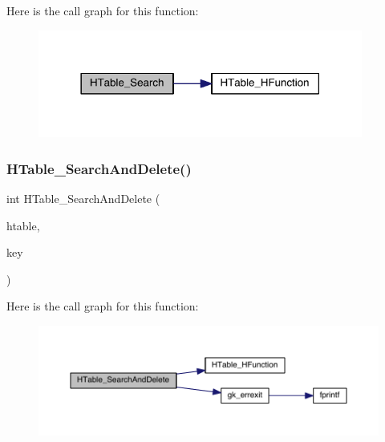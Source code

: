 Here is the call graph for this function\+:\nopagebreak
\begin{figure}[H]
\begin{center}
\leavevmode
\includegraphics[width=302pt]{a00098_a2b610fbd6017e0ef2e393c563b4809a5_cgraph}
\end{center}
\end{figure}
\mbox{\label{a00098_acb372a5e2569817f3a10cbeababda100}} 
\subsubsection{\texorpdfstring{H\+Table\+\_\+\+Search\+And\+Delete()}{HTable\_SearchAndDelete()}}
{\footnotesize\ttfamily int H\+Table\+\_\+\+Search\+And\+Delete (\begin{DoxyParamCaption}\item[{\hyperlink{a00650}{gk\+\_\+\+H\+Table\+\_\+t} $\ast$}]{htable,  }\item[{int}]{key }\end{DoxyParamCaption})}

Here is the call graph for this function\+:\nopagebreak
\begin{figure}[H]
\begin{center}
\leavevmode
\includegraphics[width=350pt]{a00098_acb372a5e2569817f3a10cbeababda100_cgraph}
\end{center}
\end{figure}

